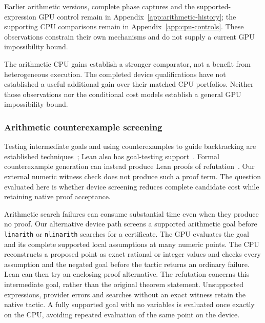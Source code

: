 \documentclass[10pt,twocolumn]{article}
\begin{document}
Earlier arithmetic versions, complete phase captures and the supported-expression GPU control remain in Appendix~\ref{app:arithmetic-history}; the supporting CPU comparisons remain in Appendix~\ref{app:cpu-controls}. These observations constrain their own mechanisms and do not supply a current GPU impossibility bound.

The arithmetic CPU gains establish a stronger comparator, not a benefit from heterogeneous execution. The completed device qualifications have not established a useful additional gain over their matched CPU portfolios. Neither those observations nor the conditional cost models establish a general GPU impossibility bound.

\subsubsection{Arithmetic counterexample screening}
Testing intermediate goals and using counterexamples to guide backtracking
are established techniques~\cite{acl2Testing}; Lean also has goal-testing
support~\cite{plausibleSource}. Formal counterexample generation can instead
produce Lean proofs of refutation~\cite{learningToDisprove}. Our external
numeric witness check does not produce such a proof term. The question
evaluated here is whether device screening reduces complete candidate cost
while retaining native proof acceptance.

Arithmetic search failures can consume substantial time even when they
produce no proof. Our alternative device path screens a supported arithmetic
goal before \texttt{linarith} or \texttt{nlinarith} searches for a certificate.
The GPU evaluates the goal and its complete supported local assumptions at
many numeric points. The CPU reconstructs a proposed point as exact rational
or integer values and checks every assumption and the negated goal before
the tactic returns an ordinary failure. Lean can then try an enclosing proof
alternative. The refutation concerns this intermediate goal, rather than the
original theorem statement. Unsupported expressions, provider errors and
searches without an exact witness retain the native tactic.
A fully supported goal with no variables is evaluated once exactly on the
CPU, avoiding repeated evaluation of the same point on the device.
\end{document}
